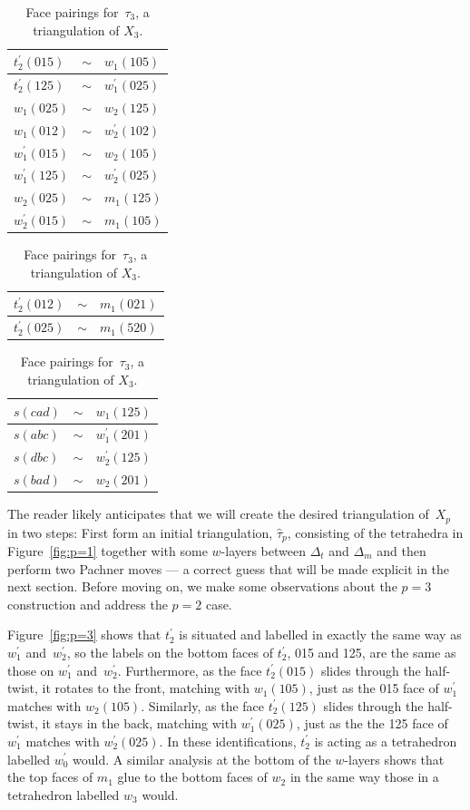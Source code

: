 \documentclass[reqno]{amsart}
\theoremstyle{plain}
\theoremstyle{definition}
\begin{document}
\begin{table}[ht]
\caption{Face pairings for~$\tau_{3}$, a triangulation of $X_3$.\label{table:p=3}}
\begin{tabular}{ |l c l|  }
   \hline
$t_2^\prime(015)$    &$\sim$	&$w_1(105)$\\
  \hline
$t_2^\prime(125)$    &$\sim$	&$w_1^\prime(025)$\\
  \hline
$w_1(025)$    &$\sim$	&$w_2(125)$\\
  \hline
 $w_1(012)$    &$\sim$	&$w_2^\prime(102)$\\
  \hline
$w_1^\prime(015)$    &$\sim$	&$w_2(105)$\\
  \hline
 $w_1^\prime(125)$    &$\sim$	&$w_2^\prime(025)$\\
  \hline
  $w_2(025)$    &$\sim$	&$m_1(125)$\\
 \hline
$w_2^\prime(015)$    &$\sim$	&$m_1(105)$\\
 \hline 
 \end{tabular}\quad
\begin{tabular}{ |l c l|  }
 \hline
 $t_2^\prime(012)$    &$\sim$	&$m_1(021)$\\
  \hline
 $t_2^\prime(025)$    &$\sim$	&$m_1(520)$\\
  \hline
 \end{tabular}
 \quad
\begin{tabular}{ |l c l|  }
 \hline
$s(cad)$    &$\sim$	&$w_1(125)$\\
  \hline
$s(abc)$    &$\sim$	&$w_1^\prime(201)$\\
  \hline
$s(dbc)$    &$\sim$	&$w_2^\prime(125)$\\
 \hline
$s(bad)$    &$\sim$	&$w_2(201)$\\
 \hline
\end{tabular}
\end{table}

The reader likely anticipates that we will create the desired triangulation of~$X_{p}$ in two steps:   First form an initial triangulation, $\hat{\tau}_p$, consisting of the tetrahedra in Figure~\ref{fig:p=1} together with some $w$-layers between $\Delta_t$ and $\Delta_m$ and then perform two Pachner moves --- a correct guess that will be made explicit in the next section.  Before moving on, we make some observations about the $p=3$ construction and address the $p=2$ case.

Figure~\ref{fig:p=3} shows that $t_2^\prime$ is situated and labelled in exactly the same way as $w_1^\prime$ and~$w_2^\prime$, so the labels on the bottom faces of $t_2^\prime$, 015 and 125, are the same as those on $w_1^\prime$ and~$w_2^\prime$.  Furthermore, as the face $t_2^\prime(015)$ slides through the half-twist, it rotates to the front, matching with $w_1(105)$, just as the 015 face of $w_1^\prime$ matches with $w_2(105)$.  Similarly, as the face $t_2^\prime(125)$ slides through the half-twist, it stays in the back, matching with $w_1^\prime(025)$, just as the the 125 face of $w_1^\prime$ matches with $w_2^\prime(025)$.  In these identifications, $t_2^\prime$ is acting as a tetrahedron labelled $w_0^\prime$ would.  A similar analysis at the bottom of the $w$-layers shows that the top faces of $m_1$ glue to the bottom faces of $w_2$ in the same way those in a tetrahedron labelled $w_3$ would.
\end{document}
